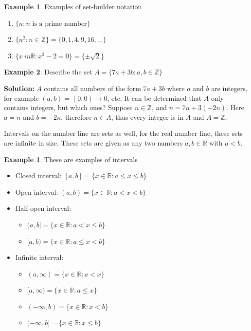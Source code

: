 \documentclass[10pt]{article}
\newcommand{\R}{\mathbb{R}}
\newcommand{\Z}{\mathbb{Z}}
\theoremstyle{definition}
\newtheorem{example}{Example}
\newtheorem*{example0}{Example}
\begin{document}
\begin{example}
    Examples of set-builder notation
    \begin{enumerate}
        \item $\{ n : n \text{ is a prime number} \}$
        \item $\{ n^2 : n \in \Z\} = \{ 0, 1, 4, 9, 16, \dots \}$
        \item $\{x \ in \R: x^2-2=0\}=\{ \pm \sqrt{2} \}$
    \end{enumerate}
\end{example}

\begin{example}
    Describe the set $A = \{ 7a + 3b: a,b \in \Z \}$

    \noindent \textbf{Solution:} $A$ contains all numbers of the form $7a + 3b$ where $a$ and $b$ are integers, for example $(a,b) = (0,0) \rightarrow 0$, etc. It can be determined that $A$ only contains integers, but which ones? Suppose $n \in \Z$, and $n = 7n + 3(-2n)$. Here $a = n$ and $b = -2n$, therefore $n \in A$, thus every integer is in $A$ and $A = \Z$.
\end{example}

Intervals on the number line are sets as well, for the real number line, these sets are infinite in size. These sets are given as any two numbers $a,b\in \R$ with $a<b$.

\begin{example0}
    These are examples of intervals
    \begin{itemize}
        \item Closed interval: $[a,b] = \{x \in \R : a \leq x \leq b\}$
        \item Open interval: $(a,b) = \{x \in \R : a < x < b\}$
        \item Half-open interval:
            \begin{itemize}
                \item $(a,b] = \{x \in \R : a < x \leq b\}$
                \item $[a,b) = \{x \in \R : a \leq x < b\}$
            \end{itemize}
        \item Infinite interval:
            \begin{itemize}
                \item $(a,\infty) = \{x \in \R: a < x\}$
                \item $[a,\infty) = \{x \in \R: a \leq x\}$
                \item $(-\infty,b) = \{x \in \R: x < b\}$
                \item $(-\infty,b] = \{x \in \R: x \leq b\}$
            \end{itemize}
    \end{itemize}
\end{example0}
\end{document}
